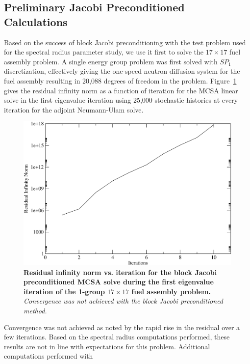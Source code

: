 \subsection{Preliminary Jacobi Preconditioned Calculations}
\label{subsec:jacobi_prec_assembly_calc}
Based on the success of block Jacobi preconditioning with the test
problem used for the spectral radius parameter study, we use it first
to solve the $17 \times 17$ fuel assembly problem. A single energy
group problem was first solved with $SP_1$ discretization, effectively
giving the one-speed neutron diffusion system for the fuel assembly
resulting in 20,088 degrees of freedom in the
problem. Figure~\ref{fig:block_jacobi_res_mcsa} gives the residual
infinity norm as a function of iteration for the MCSA linear solve in
the first eigenvalue iteration using 25,000 stochastic histories at
every iteration for the adjoint Neumann-Ulam solve.
\begin{figure}[t!]
  \begin{center}
    \includegraphics[width=5in]{chapters/spn_equations/block_jacobi_res.pdf}
  \end{center}
  \caption{\textbf{Residual infinity norm vs. iteration for the block
      Jacobi preconditioned MCSA solve during the first eigenvalue
      iteration of the 1-group $17 \times 17$ fuel assembly problem.}
    \textit{Convergence was not achieved with the block Jacobi
      preconditioned method.}}
  \label{fig:block_jacobi_res_mcsa}
\end{figure}
Convergence was not achieved as noted by the rapid rise in the
residual over a few iterations. Based on the spectral radius
computations performed, these results are not in line with
expectations for this problem. Additional computations performed with
